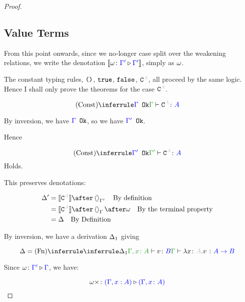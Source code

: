 \documentclass{report}
\begin{document}
\begin{framed}
\begin{proof}
        \subsection{Value Terms}
        From this point onwards, since we no-longer case split over the weakening relations, we write the denotation ${\bf [\![}\omega \colon {\color{blue}\Gamma'} \triangleright {\color {blue} \Gamma'}{\bf ]\!]}$, simply as $\omega$.
        
        
        The constant typing rules, $\texttt{()}$, $\texttt{true}$, $\texttt{false}$, $\const{A}$, all proceed by the same logic. Hence I shall only prove the theorems for the case $\const{A}$.
        
        \begin{equation}
            \truleconst
        \end{equation}
        
        By inversion, we have ${\color{blue} \Gamma} \texttt{ Ok}$, so we have ${\color{blue} \Gamma'} \texttt{ Ok}$.
        
        Hence
        
        \begin{equation}
            \ntreeruleI{Const}{\ok{\G'}}{\typerelation{\G'}{\const{A}}{A}}
        \end{equation}
        Holds.
        
        This preserves denotations:
        
        
        \begin{align*}
            \D' & = \deno{\const{A}} \after \term{\G'}\qt{By definition}\\
            & = \deno{\const{A}} \after \term{\G}\after \w \qt{By the terminal property}\\
            & = \D\qt{By Definition}\\
        \end{align*}
        
        
        By inversion, we have a derivation $\Delta_1$ giving
        
        \begin{equation}
            \D = \ntreeruleI{Fn}{
                \treeruleI{\D_1}{\typerelation{\gax}{v}{B}}
            }{\gtyperelation{\lam{x}{A}{v}}{\ab}}
        \end{equation}
        
        Since $\omega \colon {\color{blue}\Gamma'} \triangleright {\color {blue} \Gamma}$, we have:
        
        \begin{equation}
            \omega\times \colon {\color{blue}(\Gamma,x:  A)} \triangleright {\color {blue} (\Gamma, x\colon A)}
        \end{equation}
        

\end{proof}
\end{framed}
\end{document}
